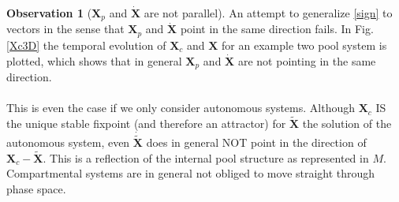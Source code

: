 \documentclass[journal abbreviation, manuscript]{copernicus}
\theoremstyle{definition}
\newtheorem{observation}{Observation}[section]
\newcommand{\X}{\mathbf{X}}
\newcommand{\figref}[1]{Fig. \ref{#1}}
\begin{document}
\begin{observation}[$\X_p$ and $\dot{\X}$ are not parallel]
An attempt to generalize \eqref{sign} to vectors in the sense that $\X_p$ and $\dot{\X}$ point in the same direction fails.
In \figref{Xc3D} the temporal evolution of $\X_c$ and $\X$ for an example two pool system is plotted,
which shows that in general $\X_p$ and $\dot{\X}$ are not pointing in the same direction.
\begin{align}

\end{align}
\begin{align}

\end{align}
\begin{align}

\end{align}
This is even the case if we only consider autonomous systems.
Although $\X_c$ IS the unique stable fixpoint (and therefore an attractor) for $\tilde{\X}$ the  solution of the autonomous system, even $\dot{\tilde{\X}}$ does in general NOT point in the direction of $\X_c-\tilde{\X}$. This is a reflection of the internal pool structure as represented in  $M$. Compartmental systems are in general not obliged to move straight through phase space.   
\end{observation}
\end{document}
